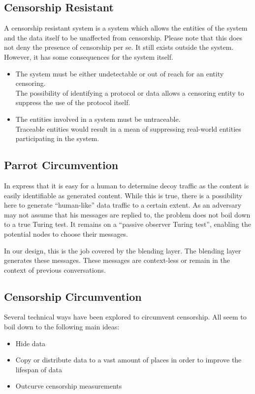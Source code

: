 \subsection{Censorship Resistant}
A censorship resistant system is a system which allows the entities of the system and the data itself to be unaffected from censorship. Please note that this does not deny the presence of censorship per se. It still exists outside the system. However, it has some consequences for the system itself.

\begin{itemize}
	\item The system must be either undetectable or out of reach for an entity censoring.\\
	      The possibility of identifying a protocol or data allows a censoring entity to suppress the use of the protocol itself. 
	\item The entities involved in a system must be untraceable.\\
	      Traceable entities would result in a mean of suppressing real-world entities participating in the system.
\end{itemize}

\subsection{Parrot Circumvention}
In \cite{oakland2013-parrot} \citeauthor{oakland2013-parrot} express that it is easy for a human to determine decoy traffic as the content is easily identifiable as generated content. While this is true, there is a possibility here to generate ``human-like'' data traffic to a certain extent. As an adversary may not assume that his messages are replied to, the problem does not boil down to a true Turing test. It remains on a ``passive observer Turing test'', enabling the potential nodes to choose their messages. 

In our design, this is the job covered by the blending layer. The blending layer generates these messages. These messages are context-less or remain in the context of previous conversations.

\subsection{Censorship Circumvention}
Several technical ways have been explored to circumvent censorship. All seem to boil down to the following main ideas:
\begin{itemize}
	\item Hide data
	\item Copy or distribute data to a vast amount of places in order to improve the lifespan of data
	\item Outcurve censorship measurements
\end{itemize}

